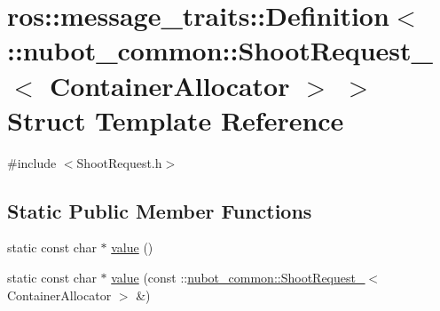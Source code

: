 \hypertarget{structros_1_1message__traits_1_1Definition_3_01_1_1nubot__common_1_1ShootRequest___3_01ContainerAllocator_01_4_01_4}{\section{ros\-:\-:message\-\_\-traits\-:\-:Definition$<$ \-:\-:nubot\-\_\-common\-:\-:Shoot\-Request\-\_\-$<$ Container\-Allocator $>$ $>$ Struct Template Reference}
\label{structros_1_1message__traits_1_1Definition_3_01_1_1nubot__common_1_1ShootRequest___3_01ContainerAllocator_01_4_01_4}
}


{\ttfamily \#include $<$Shoot\-Request.\-h$>$}

\subsection*{Static Public Member Functions}
\begin{DoxyCompactItemize}
\item 
static const char $\ast$ \hyperlink{structros_1_1message__traits_1_1Definition_3_01_1_1nubot__common_1_1ShootRequest___3_01ContainerAllocator_01_4_01_4_ac56b088d86fe1261feacdc658c2b6d48}{value} ()
\item 
static const char $\ast$ \hyperlink{structros_1_1message__traits_1_1Definition_3_01_1_1nubot__common_1_1ShootRequest___3_01ContainerAllocator_01_4_01_4_afcd073e8c2374c8ee068c9963a296bd4}{value} (const \-::\hyperlink{structnubot__common_1_1ShootRequest__}{nubot\-\_\-common\-::\-Shoot\-Request\-\_\-}$<$ Container\-Allocator $>$ \&)
\end{DoxyCompactItemize}


